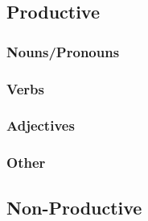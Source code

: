 \subsection{Productive}

\subsubsection{Nouns/Pronouns}

\subsubsection{Verbs}

\subsubsection{Adjectives}

\subsubsection{Other}

\subsection{Non-Productive}